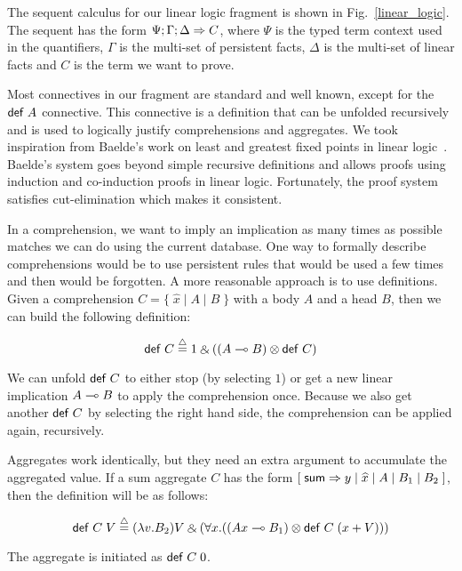The sequent calculus for our linear logic fragment is shown in Fig.~\ref{linear_logic}.
The sequent has the form $\Psi ; \Gamma ; \Delta \Rightarrow C$, where $\Psi$ is the typed
term context used in the quantifiers, $\Gamma$ is the multi-set of persistent facts, $\Delta$
is the multi-set of linear facts and $C$ is the term we want to prove.

Most connectives in our fragment are standard and well known, except for the $\mathsf{def} \; A$ connective. This
connective is a definition that can be unfolded recursively and is used to logically justify
comprehensions and aggregates. We took inspiration from Baelde's work on least and greatest fixed points
in linear logic~\cite{Baelde:2012:LGF:2071368.2071370}. Baelde's system goes beyond simple recursive
definitions and allows proofs using induction and co-induction proofs in linear logic. Fortunately,
the proof system satisfies cut-elimination which makes it consistent. 

In a comprehension, we want to imply an implication as many times as possible matches we can do
using the current database. One way to formally describe comprehensions would be to use persistent
rules that would be used a few times and then would be forgotten. A more reasonable approach is to use
definitions. Given a comprehension $C = \{ \; \widehat{x} \; | \; A \; | \; B \; \}$ with a body $A$ and a head $B$, then we can build the following definition:

\[
\compr{C} \defeq 1 \with ((A \lolli B) \otimes \compr{C})
\]

We can unfold $\mathsf{def} \; C$ to either stop (by selecting $1$) or get a new linear implication $A \multimap B$
to apply the comprehension once. Because we also get another $\mathsf{def} \; C$ by selecting the right hand side,
the comprehension can be applied again, recursively.

Aggregates work identically, but they need an extra argument to accumulate the aggregated value. If a sum aggregate $C$ has the form $[\;\mathsf{sum} \Rightarrow y \; | \; \widehat{x} \; | \; A \; | \; B_1 \; | \; B_2 \;]$, then the definition will be as follows:

\[
\compr{C} \; V \defeq (\lambda v. B_2)V \with (\forall x. ((Ax \lolli B_1) \otimes \compr{C} \; (x + V)))
\]

The aggregate is initiated as $\mathsf{def} \; C \; 0$.


